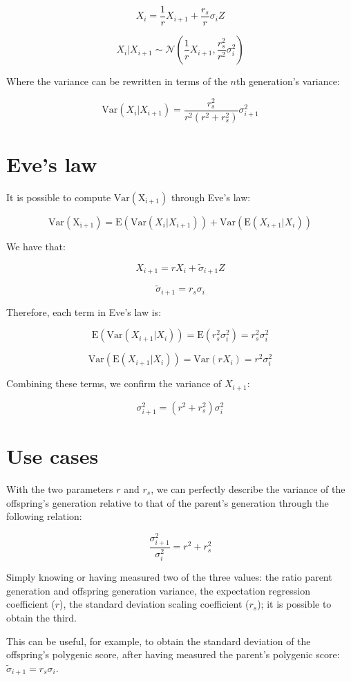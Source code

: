 \documentclass[a4paper,11pt]{article}
\begin{document}
$$X_i = \frac{1}{r}X_{i+1} + \frac{r_s}{r}\sigma_iZ$$


$$X_i|X_{i+1} \sim \mathcal{N}(\frac{1}{r}X_{i+1}, \frac{r_s^2}{r^2}\sigma_i^2)$$


Where the variance can be rewritten in terms of the $n$th generation's variance:

$$\mathrm{Var}(X_i|X_{i+1}) = \frac{r_s^2}{r^2(r^2+r_s^2)} \sigma_{i+1}^2$$

\section{Eve's law}
It is possible to compute $\mathrm{Var(X_{i+1})}$ through Eve's law:

$$\mathrm{Var(X_{i+1})} = \mathrm{E}(\mathrm{Var}(X_i|X_{i+1})) + \mathrm{Var}(\mathrm{E}(X_{i+1}|X_i))$$

We have that:

$$X_{i+1} = rX_i + \tilde{\sigma}_{i+1} Z$$

$$\tilde{\sigma}_{i+1} = r_s \sigma_i$$

Therefore, each term in Eve's law is:

$$\mathrm{E}(\mathrm{Var}(X_{i+1}|X_i)) = \mathrm{E}(r_s^2 \sigma_i^2) = r_s^2 \sigma_i^2$$

$$\mathrm{Var}(\mathrm{E}(X_{i+1}|X_i)) = \mathrm{Var}(rX_i) = r^2\sigma_i^2$$

Combining these terms, we confirm the variance of $X_{i+1}$:

$$\sigma_{i+1}^2 = (r^2+r_s^2)  \sigma_i^2$$





\section{Use cases}
With the two parameters $r$ and $r_s$, we can perfectly describe the variance of the offspring's generation relative to that of the parent's generation through the following relation:

$$\frac{\sigma_{i+1}^2}{\sigma_i^2} = r^2+r_s^2$$

Simply knowing or having measured two of the three values: the ratio parent generation and offspring generation variance, the expectation regression coefficient ($r$), the standard deviation scaling coefficient ($r_s$); it is possible to obtain the third.

This can be useful, for example, to obtain the standard deviation of the offspring's polygenic score, after having measured the parent's polygenic score: $\tilde{\sigma}_{i+1} = r_s \sigma_i$.
\end{document}
